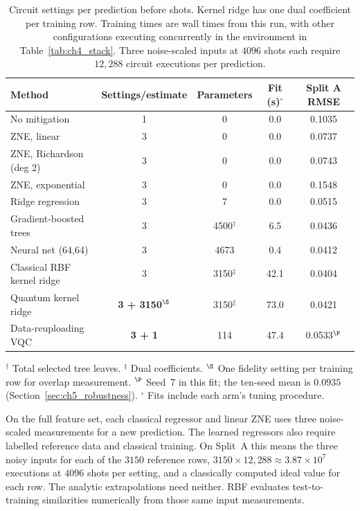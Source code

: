 \documentclass[Thesis.tex]{subfiles}
\begin{document}
\begin{table}[htbp]
\centering
\caption[Cost per method]{Circuit settings per prediction before shots.
Kernel ridge has one dual coefficient per training row. Training times are
wall times from this run, with other configurations executing concurrently
in the environment in Table~\ref{tab:ch4_stack}. Three noise-scaled inputs
at $4096$ shots each require $12{,}288$ circuit executions per prediction.}
\label{tab:ch5_cost}
\small
\begin{tabular}{lcccc}
\toprule
\textbf{Method} & \textbf{Settings/estimate} & \textbf{Parameters}
& \textbf{Fit (s)}$^{\circ}$ & \textbf{Split A RMSE} \\
\midrule
No mitigation & 1 & 0 & 0.0 & 0.1035 \\
ZNE, linear & 3 & 0 & 0.0 & 0.0737 \\
ZNE, Richardson (deg 2) & 3 & 0 & 0.0 & 0.0743 \\
ZNE, exponential & 3 & 0 & 0.0 & 0.1548 \\
Ridge regression & 3 & 7 & 0.0 & 0.0515 \\
Gradient-boosted trees & 3 & 4500$^{\dagger}$ & 6.5 & 0.0436 \\
Neural net (64,64) & 3 & 4673 & 0.4 & 0.0412 \\
Classical RBF kernel ridge & 3 & 3150$^{\ddagger}$ & 42.1 & 0.0404 \\
Quantum kernel ridge & \textbf{3 + 3150}$^{\S}$ & 3150$^{\ddagger}$ & 73.0 & 0.0421 \\
Data-reuploading VQC & \textbf{3 + 1} & 114 & 47.4 & 0.0533$^{\P}$ \\
\bottomrule
\end{tabular}
\par\smallskip
\parbox{0.97\linewidth}{\footnotesize
$^{\dagger}$ Total selected tree leaves. $^{\ddagger}$ Dual coefficients.
$^{\S}$ One fidelity setting per training row for overlap measurement.
$^{\P}$ Seed~7 in this fit; the ten-seed mean is $0.0935$ (Section~\ref{sec:ch5_robustness}).
$^{\circ}$ Fits include each arm's tuning procedure.}
\end{table}

On the full feature set, each classical regressor and linear ZNE uses three
noise-scaled measurements for a new prediction. The learned regressors also
require labelled reference data and classical training. On Split~A this means the
three noisy inputs for each of the $3150$ reference rows,
$3150 \times 12{,}288 \approx 3.87\times10^{7}$ executions at $4096$ shots per setting,
and a classically computed ideal value for each row. The analytic extrapolations
need neither. RBF evaluates
test-to-training similarities numerically from those same input measurements.
\end{document}
